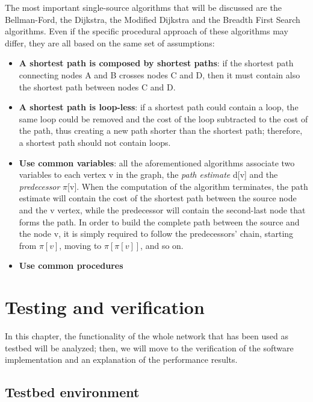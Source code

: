\documentclass[10pt,a4paper]{report}
\begin{document}
The most important single-source algorithms that will be discussed are
the Bellman-Ford, the Dijkstra, the Modified Dijkstra and the Breadth
First Search algorithms. Even if the specific procedural approach of
these algorithms may differ, they are all based on the same set of
assumptions:
\begin{itemize}
\item \textbf{A shortest path is composed by shortest paths}: if the
  shortest path connecting nodes A and B crosses nodes C and D, then
  it must contain also the shortest path between nodes C and D.
\item \textbf{A shortest path is loop-less}: if a shortest path could
  contain a loop, the same loop could be removed and the cost of the
  loop subtracted to the cost of the path, thus creating a new path
  shorter than the shortest path; therefore, a shortest path should
  not contain loops. 
\item \textbf{Use common variables}: all the aforementioned algorithms
  associate two variables to each vertex v in the graph, the
  \textit{path estimate} d[v] and the \textit{predecessor}
  \(\pi\)[v]. When the computation of the algorithm terminates, the
  path estimate will contain the cost of the shortest path between the
  source node and the v vertex, while the predecessor will contain the
  second-last node that forms the path. In order to build the complete
  path between the source and the node v, it is simply required to
  follow the predecessors' chain, starting from \(\pi[v]\), moving to
  \(\pi[\pi[v]]\), and so on.
\item \textbf{Use common procedures}
\end{itemize}












\chapter{Testing and verification}

In this chapter, the functionality of the whole network that has been
used as testbed will be analyzed; then, we will move to the
verification of the software implementation and an explanation of the
performance results.

\section{Testbed environment}
\end{document}
